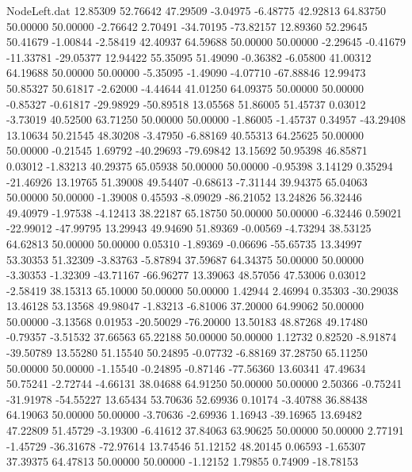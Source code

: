 \begin{filecontents}{NodeLeft.dat}
  12.85309   52.76642   47.29509    -3.04975   -6.48775   42.92813   64.83750   50.00000   50.00000   -2.76642    2.70491  -34.70195  -73.82157
  12.89360   52.29645   50.41679    -1.00844   -2.58419   42.40937   64.59688   50.00000   50.00000   -2.29645   -0.41679  -11.33781  -29.05377
  12.94422   55.35095   51.49090    -0.36382   -6.05800   41.00312   64.19688   50.00000   50.00000   -5.35095   -1.49090   -4.07710  -67.88846
  12.99473   50.85327   50.61817    -2.62000   -4.44644   41.01250   64.09375   50.00000   50.00000   -0.85327   -0.61817  -29.98929  -50.89518
  13.05568   51.86005   51.45737     0.03012   -3.73019   40.52500   63.71250   50.00000   50.00000   -1.86005   -1.45737    0.34957  -43.29408
  13.10634   50.21545   48.30208    -3.47950   -6.88169   40.55313   64.25625   50.00000   50.00000   -0.21545    1.69792  -40.29693  -79.69842
  13.15692   50.95398   46.85871     0.03012   -1.83213   40.29375   65.05938   50.00000   50.00000   -0.95398    3.14129    0.35294  -21.46926
  13.19765   51.39008   49.54407    -0.68613   -7.31144   39.94375   65.04063   50.00000   50.00000   -1.39008    0.45593   -8.09029  -86.21052
  13.24826   56.32446   49.40979    -1.97538   -4.12413   38.22187   65.18750   50.00000   50.00000   -6.32446    0.59021  -22.99012  -47.99795
  13.29943   49.94690   51.89369    -0.00569   -4.73294   38.53125   64.62813   50.00000   50.00000    0.05310   -1.89369   -0.06696  -55.65735
  13.34997   53.30353   51.32309    -3.83763   -5.87894   37.59687   64.34375   50.00000   50.00000   -3.30353   -1.32309  -43.71167  -66.96277
  13.39063   48.57056   47.53006     0.03012   -2.58419   38.15313   65.10000   50.00000   50.00000    1.42944    2.46994    0.35303  -30.29038
  13.46128   53.13568   49.98047    -1.83213   -6.81006   37.20000   64.99062   50.00000   50.00000   -3.13568    0.01953  -20.50029  -76.20000
  13.50183   48.87268   49.17480    -0.79357   -3.51532   37.66563   65.22188   50.00000   50.00000    1.12732    0.82520   -8.91874  -39.50789
  13.55280   51.15540   50.24895    -0.07732   -6.88169   37.28750   65.11250   50.00000   50.00000   -1.15540   -0.24895   -0.87146  -77.56360
  13.60341   47.49634   50.75241    -2.72744   -4.66131   38.04688   64.91250   50.00000   50.00000    2.50366   -0.75241  -31.91978  -54.55227
  13.65434   53.70636   52.69936     0.10174   -3.40788   36.88438   64.19063   50.00000   50.00000   -3.70636   -2.69936    1.16943  -39.16965
  13.69482   47.22809   51.45729    -3.19300   -6.41612   37.84063   63.90625   50.00000   50.00000    2.77191   -1.45729  -36.31678  -72.97614
  13.74546   51.12152   48.20145     0.06593   -1.65307   37.39375   64.47813   50.00000   50.00000   -1.12152    1.79855    0.74909  -18.78153

\end{filecontents}
